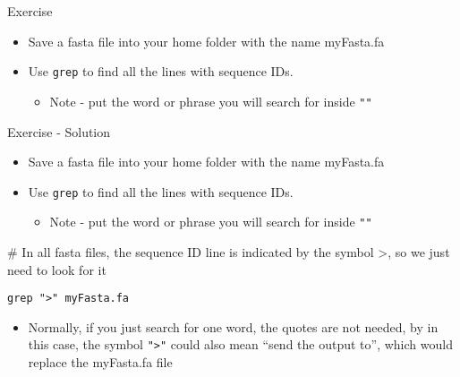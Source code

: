 \documentclass[
  ignorenonframetext,
]{beamer}
\providecommand{\tightlist}{%
  \setlength{\itemsep}{0pt}\setlength{\parskip}{0pt}}
\begin{document}
\begin{frame}[fragile]{Exercise}
\protect\hypertarget{slide12}{}
\begin{itemize}[<+->]
\tightlist
\item
  Save a fasta file into your home folder with the name myFasta.fa
\item
  Use \texttt{grep} to find all the lines with sequence IDs.

  \begin{itemize}[<+->]
  \tightlist
  \item
    Note - put the word or phrase you will search for inside \texttt{""}
  \end{itemize}
\end{itemize}
\end{frame}

\begin{frame}[fragile]{Exercise - Solution}
\protect\hypertarget{slide13}{}
\begin{itemize}[<+->]
\tightlist
\item
  Save a fasta file into your home folder with the name myFasta.fa
\item
  Use \texttt{grep} to find all the lines with sequence IDs.

  \begin{itemize}[<+->]
  \tightlist
  \item
    Note - put the word or phrase you will search for inside \texttt{""}
  \end{itemize}
\end{itemize}

\begin{block}{}
\protect\hypertarget{section-12}{}
\#{ In all fasta files, the sequence ID line is indicated by the symbol
\textgreater, so we just need to look for it}

\texttt{grep\ "\textgreater{}"\ myFasta.fa}
\end{block}

\begin{block}{}
\protect\hypertarget{section-13}{}
\begin{itemize}[<+->]
\tightlist
\item
  Normally, if you just search for one word, the quotes are not needed,
  by in this case, the symbol \texttt{"\textgreater{}"} could also mean
  ``send the output to'', which would replace the myFasta.fa file
\end{itemize}
\end{block}
\end{frame}
\end{document}
